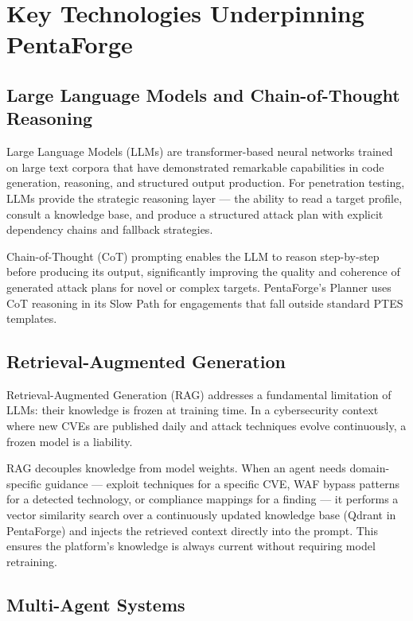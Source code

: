 \documentclass[12pt,a4paper]{report}
\begin{document}
\section{Key Technologies Underpinning PentaForge}

\subsection{Large Language Models and Chain-of-Thought Reasoning}

Large Language Models (LLMs) are transformer-based neural networks trained on
large text corpora that have demonstrated remarkable capabilities in code generation,
reasoning, and structured output production. For penetration testing, LLMs provide
the strategic reasoning layer --- the ability to read a target profile, consult a
knowledge base, and produce a structured attack plan with explicit dependency chains
and fallback strategies.

Chain-of-Thought (CoT) prompting enables the LLM to reason step-by-step before
producing its output, significantly improving the quality and coherence of generated
attack plans for novel or complex targets. PentaForge's Planner uses CoT reasoning
in its Slow Path for engagements that fall outside standard PTES templates.

\subsection{Retrieval-Augmented Generation}

Retrieval-Augmented Generation (RAG) addresses a fundamental limitation of LLMs:
their knowledge is frozen at training time. In a cybersecurity context where new
CVEs are published daily and attack techniques evolve continuously, a frozen model
is a liability.

RAG decouples knowledge from model weights. When an agent needs domain-specific
guidance --- exploit techniques for a specific CVE, WAF bypass patterns for a
detected technology, or compliance mappings for a finding --- it performs a vector
similarity search over a continuously updated knowledge base (Qdrant in
PentaForge) and injects the retrieved context directly into the prompt. This
ensures the platform's knowledge is always current without requiring model
retraining.

\subsection{Multi-Agent Systems}
\end{document}
